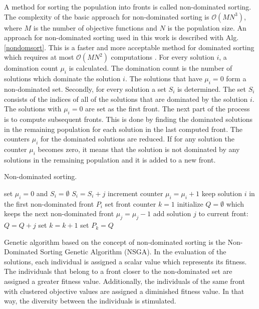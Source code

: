 A method for sorting the population into fronts is called non-dominated sorting. 
The complexity of the basic approach for non-dominated sorting is $\mathcal{O}(MN^3)$, where $M$ is the number of objective functions and $N$ is the population size.
An approach for non-dominated sorting used in this work is described with Alg. 
\ref{nondomsort}. This is a faster and more acceptable method for dominated sorting which requires at most $\mathcal{O}(MN^2)$ computations \cite{deb2001multi}.
For every solution $i$, a domination count $\mu_i$ is calculated. 
The domination count is the number of solutions which dominate the solution $i$. 
The solutions that have $\mu_i = 0$ form a non-dominated set.
Secondly, for every solution a set $S_i$ is determined. The set $S_i$ consists of the indices of all of the solutions that are dominated by the solution $i$. 
The solutions with $\mu_i=0$ are set as the first front. 
The next part of the process is to compute subsequent fronts.
This is done by finding the dominated solutions in the remaining population for each solution in the last computed front.
The counters $\mu_i$ for the dominated solutions are reduced. 
If for any solution the counter $\mu_i$ becomes zero, it means that the solution is not dominated by any solutions in the remaining population and it is added to a new front. 

\begin{algorithm}
\caption{Non-dominated sorting.\label{nondomsort}}
\begin{algorithmic}[1]
\State set $\mu_i = 0$ and $S_i = \emptyset$
\EndFor
{}
\State $S_i = S_i + j$
\State increment counter $\mu_i = \mu_i + 1$
\EndIf
{} 
\State keep solution $i$ in the first non-dominated front $P_i$
\State set front counter $k=1$
\EndIf
\EndFor
{}
\State initialize $Q = \emptyset$ which keeps the next non-dominated front
\State $\mu_j = \mu_j - 1$
\State add solution $j$ to current front: $Q = Q + j$
\EndIf
\EndFor
\State set $k = k+1$
\State set $P_k = Q$
\EndWhile
\end{algorithmic}
\end{algorithm}

Genetic algorithm based on the concept of non-dominated sorting is the Non-Dominated Sorting Genetic Algorithm (NSGA). 
In the evaluation of the solutions, each individual is assigned a scalar value which represents its fitness. 
The individuals that belong to a front closer to the non-dominated set are assigned a greater fitness value. Additionally, the individuals of the same front with clustered objective values are assigned a diminished fitness value. 
In that way, the diversity between the individuals is stimulated. 

